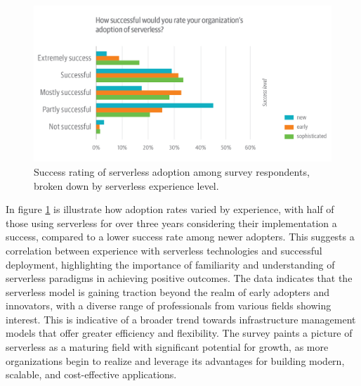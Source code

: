 \begin{figure}
    \centering
    \includegraphics[scale=0.3]{Pictures/3_serverless_adoption_rating.png}
    \caption{Success rating of serverless adoption among survey respondents, broken down by serverless experience level.}
    \label{fig:3_serverless_adoption_rating}
\end{figure}

In figure \ref{fig:3_serverless_adoption_rating} is illustrate how adoption rates varied by
experience, with half of those using serverless for over three years considering their
implementation a success, compared to a lower success rate among newer adopters. This suggests a
correlation between experience with serverless technologies and successful deployment, highlighting
the importance of familiarity and understanding of serverless paradigms in achieving positive
outcomes.
\newline\newline
The data indicates that the serverless model is gaining traction beyond the realm of
early adopters and innovators, with a diverse range of professionals from various fields showing
interest. This is indicative of a broader trend towards infrastructure management models that offer
greater efficiency and flexibility. The survey paints a picture of serverless as a maturing
field with significant potential for growth, as more organizations begin to realize and leverage its
advantages for building modern, scalable, and cost-effective applications.

